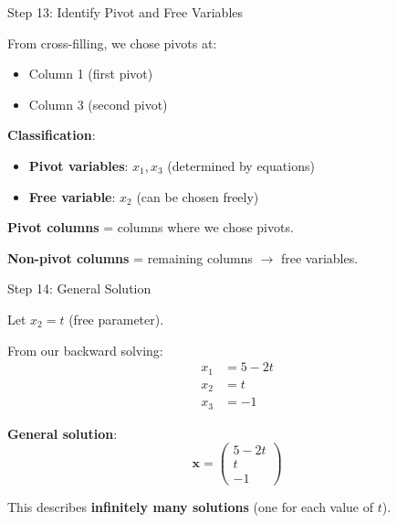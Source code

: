 \documentclass[10pt]{beamer}
\theoremstyle{definition}
\newcommand{\x}[1]{\alert{\textbf{#1}}}
\begin{document}
\begin{frame}{Step 13: Identify Pivot and Free Variables}

From cross-filling, we chose pivots at:
\begin{itemize}
\item Column 1 (first pivot)
\item Column 3 (second pivot)
\end{itemize}

\vspace{1em}

\x{Classification}:
\begin{itemize}
\item \x{Pivot variables}: $x_1, x_3$ (determined by equations)
\item \x{Free variable}: $x_2$ (can be chosen freely)
\end{itemize}

\vspace{1em}

\x{Pivot columns} = columns where we chose pivots.

\x{Non-pivot columns} = remaining columns $\to$ free variables.

\end{frame}

\begin{frame}{Step 14: General Solution}

Let $x_2 = t$ (free parameter).

\vspace{1em}

From our backward solving:
\begin{align*}
x_1 &= 5 - 2t \\
x_2 &= t \\
x_3 &= -1
\end{align*}

\vspace{1em}

\x{General solution}:
$$\mathbf{x} = \begin{pmatrix} 5 - 2t \\ t \\ -1 \end{pmatrix}$$

\vspace{1em}

This describes \x{infinitely many solutions} (one for each value of $t$).

\end{frame}
\end{document}
